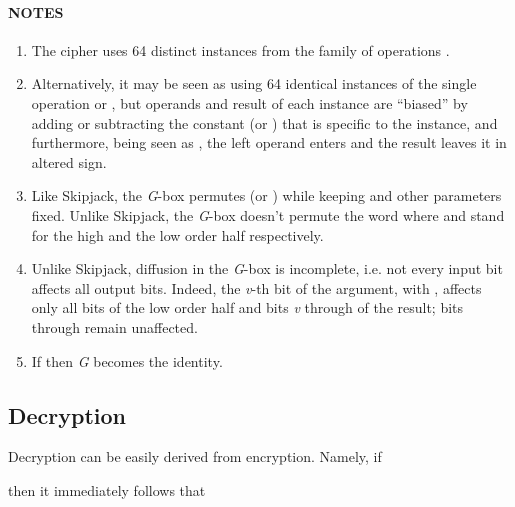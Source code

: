 \documentclass[a4paper,oneside,english]{amsart}
\numberwithin{equation}{section}
\numberwithin{figure}{section}
\begin{document}
\paragraph*{NOTES}
\begin{enumerate}
\item The cipher uses 64 distinct instances from the family of operations
.
\item Alternatively, it may be seen as using 64 identical instances of the
single operation  or , but operands and result of
each instance are {}``biased'' by adding or subtracting the constant
 (or ) that is specific to the instance, and furthermore,
being seen as , the left operand enters and the result leaves
it in altered sign.
\item Like Skipjack, the \emph{G}-box permutes  (or ) while
keeping  and other parameters fixed. Unlike Skipjack, the \emph{G}-box
doesn't permute the word 
where  and  stand for the high and
the low order half respectively.
\item Unlike Skipjack, diffusion in the \emph{G}-box is incomplete, i.e.
not every input bit affects all output bits. Indeed, the \emph{v}-th
bit of the argument, with , affects only all bits of the low
order half and bits \emph{v} through  of the result; bits 
through  remain unaffected.
\item If  then \emph{G}
becomes the identity.
\end{enumerate}

\subsection{Decryption}

Decryption can be easily derived from encryption. Namely, if




then it immediately follows that
\end{document}
